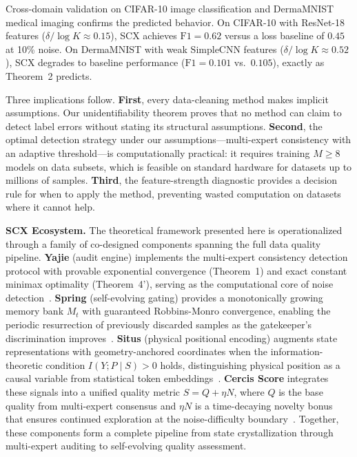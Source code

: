 \documentclass[12pt,a4paper]{article}
\begin{document}
Cross-domain validation on CIFAR-10 image classification and DermaMNIST medical imaging confirms the predicted behavior. On CIFAR-10 with ResNet-18 features ($\delta / \log K \approx 0.15$), SCX achieves $\mathrm{F1}=0.62$ versus a loss baseline of $0.45$ at 10\% noise. On DermaMNIST with weak SimpleCNN features ($\delta / \log K \approx 0.52$), SCX degrades to baseline performance ($\mathrm{F1}=0.101$ vs.\ $0.105$), exactly as Theorem~2 predicts.

Three implications follow. \textbf{First}, every data-cleaning method makes implicit assumptions. Our unidentifiability theorem proves that no method can claim to detect label errors without stating its structural assumptions. \textbf{Second}, the optimal detection strategy under our assumptions---multi-expert consistency with an adaptive threshold---is computationally practical: it requires training $M \geq 8$ models on data subsets, which is feasible on standard hardware for datasets up to millions of samples. \textbf{Third}, the feature-strength diagnostic provides a decision rule for when to apply the method, preventing wasted computation on datasets where it cannot help.

\textbf{SCX Ecosystem.} The theoretical framework presented here is operationalized through a family of co-designed components spanning the full data quality pipeline. \textbf{Yajie} (audit engine) implements the multi-expert consistency detection protocol with provable exponential convergence (Theorem~1) and exact constant minimax optimality (Theorem~4'), serving as the computational core of noise detection~\cite{xi2025scx}. \textbf{Spring} (self-evolving gating) provides a monotonically growing memory bank $M_t$ with guaranteed Robbins-Monro convergence, enabling the periodic resurrection of previously discarded samples as the gatekeeper's discrimination improves~\cite{spring_config}. \textbf{Situs} (physical positional encoding) augments state representations with geometry-anchored coordinates when the information-theoretic condition $I(Y;P \mid S) > 0$ holds, distinguishing physical position as a causal variable from statistical token embeddings~\cite{situs_theory}. \textbf{Cercis Score} integrates these signals into a unified quality metric $S = Q + \eta N$, where $Q$ is the base quality from multi-expert consensus and $\eta N$ is a time-decaying novelty bonus that ensures continued exploration at the noise-difficulty boundary~\cite{taxonomic_nn}. Together, these components form a complete pipeline from state crystallization through multi-expert auditing to self-evolving quality assessment.
\end{document}
